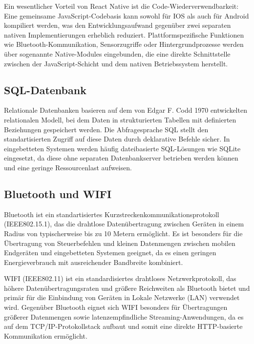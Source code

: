 Ein wesentlicher Vorteil von React Native ist die Code-Wiederverwendbarkeit: Eine gemeinsame JavaScript-Codebasis kann sowohl für IOS als auch für Android kompiliert werden, was den Entwicklungsaufwand gegenüber zwei separaten nativen Implementierungen erheblich reduziert. Plattformspezifische Funktionen wie Bluetooth-Kommunikation, Sensorzugriffe oder Hintergrundprozesse werden über sogenannte Native-Modules eingebunden, die eine direkte Schnittstelle zwischen der JavaScript-Schicht und dem nativen Betriebssystem herstellt.\autocite[vgl. S.1ff]{eisenmanLearningReactNative2015}

\newpage

\subsection{SQL-Datenbank}
\label{subsec:SQL}
Relationale Datenbanken basieren auf dem von Edgar F. Codd 1970 entwickelten relationalen Modell, bei dem Daten in strukturierten Tabellen mit definierten Beziehungen gespeichert werden. Die Abfragesprache \ac{SQL} stellt den standartisierten Zugriff auf diese Daten durch deklarative Befehle sicher.\autocite[vgl. S.377f]{coddRelationalModelData1970} In eingebetteten Systemen werden häufig dateibasierte SQL-Lösungen wie SQLite eingesetzt, da diese ohne separaten Datenbankserver betrieben werden können und eine geringe Ressourcenlast aufweisen.\autocite[vgl.]{SQLiteDocumentation}

\subsection{Bluetooth und WIFI}
Bluetooth ist ein standartisiertes Kurzstreckenkommunikationsprotokoll (IEEE802.15.1), das die drahtlose Datenübertragung zwischen Geräten in einem Radius von typischerweise bis zu 10 Metern ermöglicht. Es ist besonders für die Übertragung von Steuerbefehlen und kleinen Datenmengen zwischen mobilen Endgeräten und eingebetteten Systemen geeignet, da es einen geringen Energieverbrauch mit ausreichender Bandbreite kombiniert.\autocite[vgl. S.5f]{StandardInformationTechnology}

\ac{WIFI} (IEEE802.11) ist ein standardisiertes drahtloses Netzwerkprotokoll, das höhere Datenübertragungsraten und größere Reichweiten als Bluetooth bietet und primär für die Einbindung von Geräten in Lokale Netzwerke (\ac{LAN}) verwendet wird. Gegenüber Bluetooth eignet sich \ac{WIFI} besonders für Übertragungen größerer Datenmengen sowie latenzempfindliche Streaming-Anwendungen, da es auf dem \ac{TCP}/\ac{IP}-Protokollstack aufbaut und somit eine direkte \ac{HTTP}-basierte Kommunikation ermöglicht.\autocite[vgl.]{IEEE80211WLANGrundlagen}

